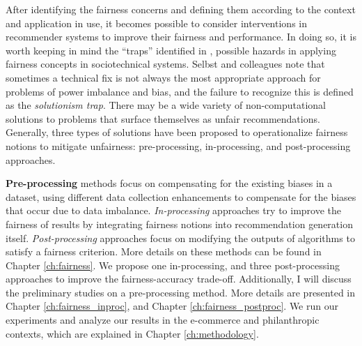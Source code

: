    After identifying the fairness concerns and defining them according to the context and application in use, it becomes possible to consider interventions in recommender systems to improve their fairness and performance. In doing so, it is worth keeping in mind the ``traps'' identified in \cite{selbst2019fairness}, possible hazards in applying fairness concepts in sociotechnical systems. Selbst and colleagues note that sometimes a technical fix is not always the most appropriate approach for problems of power imbalance and bias, and the failure to recognize this is defined as the \textit{solutionism trap}. There may be a wide variety of non-computational solutions to problems that surface themselves as unfair recommendations. Generally, three types of solutions have been proposed to operationalize fairness notions to mitigate unfairness: pre-processing, in-processing, and post-processing approaches.
    
    \textbf{Pre-processing} methods focus on compensating for the existing biases in a dataset, using different data collection enhancements to compensate for the biases that occur due to data imbalance. \textit{In-processing} approaches try to improve the fairness of results by integrating fairness notions into recommendation generation itself. \textit{Post-processing} approaches focus on modifying the outputs of algorithms to satisfy a fairness criterion. More details on these methods can be found in Chapter \ref{ch:fairness}. We propose one in-processing, and three post-processing approaches to improve the fairness-accuracy trade-off. Additionally, I will discuss the preliminary studies on a pre-processing method. More details are presented in Chapter \ref{ch:fairness_inproc}, and Chapter \ref{ch:fairness_postproc}. We run our experiments and analyze our results in the e-commerce and philanthropic contexts, which are explained in Chapter \ref{ch:methodology}.





